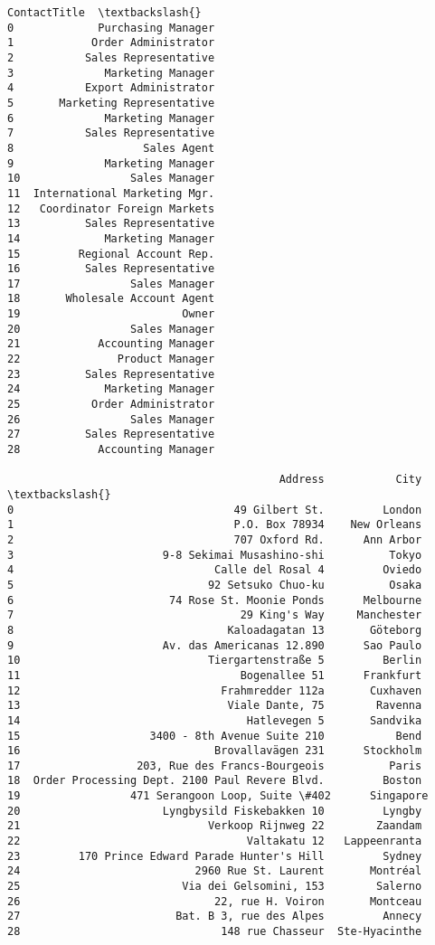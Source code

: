 \documentclass[11pt]{article}
\begin{document}
\begin{Verbatim}[commandchars=\\\{\}]
                    ContactTitle  \textbackslash{}
0             Purchasing Manager
1            Order Administrator
2           Sales Representative
3              Marketing Manager
4           Export Administrator
5       Marketing Representative
6              Marketing Manager
7           Sales Representative
8                    Sales Agent
9              Marketing Manager
10                 Sales Manager
11  International Marketing Mgr.
12   Coordinator Foreign Markets
13          Sales Representative
14             Marketing Manager
15         Regional Account Rep.
16          Sales Representative
17                 Sales Manager
18       Wholesale Account Agent
19                         Owner
20                 Sales Manager
21            Accounting Manager
22               Product Manager
23          Sales Representative
24             Marketing Manager
25           Order Administrator
26                 Sales Manager
27          Sales Representative
28            Accounting Manager

                                          Address           City  \textbackslash{}
0                                  49 Gilbert St.         London
1                                  P.O. Box 78934    New Orleans
2                                  707 Oxford Rd.      Ann Arbor
3                       9-8 Sekimai Musashino-shi          Tokyo
4                               Calle del Rosal 4         Oviedo
5                              92 Setsuko Chuo-ku          Osaka
6                        74 Rose St. Moonie Ponds      Melbourne
7                                   29 King's Way     Manchester
8                                 Kaloadagatan 13       Göteborg
9                       Av. das Americanas 12.890      Sao Paulo
10                             Tiergartenstraße 5         Berlin
11                                  Bogenallee 51      Frankfurt
12                               Frahmredder 112a       Cuxhaven
13                                Viale Dante, 75        Ravenna
14                                   Hatlevegen 5       Sandvika
15                    3400 - 8th Avenue Suite 210           Bend
16                              Brovallavägen 231      Stockholm
17                  203, Rue des Francs-Bourgeois          Paris
18  Order Processing Dept. 2100 Paul Revere Blvd.         Boston
19                 471 Serangoon Loop, Suite \#402      Singapore
20                      Lyngbysild Fiskebakken 10         Lyngby
21                             Verkoop Rijnweg 22        Zaandam
22                                   Valtakatu 12   Lappeenranta
23         170 Prince Edward Parade Hunter's Hill         Sydney
24                           2960 Rue St. Laurent       Montréal
25                         Via dei Gelsomini, 153        Salerno
26                              22, rue H. Voiron       Montceau
27                        Bat. B 3, rue des Alpes         Annecy
28                               148 rue Chasseur  Ste-Hyacinthe


\end{Verbatim}
\end{document}
